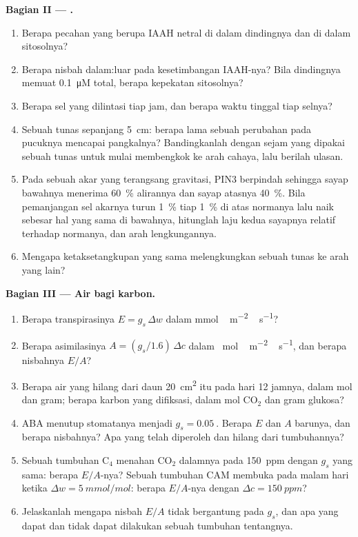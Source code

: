 \begin{problem}
\medskip
\noindent\textbf{Bagian II --- .}
\begin{enumerate}[resume]
  \item Berapa pecahan  yang berupa IAAH netral di dalam dindingnya dan di dalam
        sitosolnya?
  \item Berapa nisbah dalam:luar pada kesetimbangan IAAH-nya? Bila dindingnya memuat
        \qty{0.1}{\micro M}  total, berapa kepekatan
        sitosolnya?
  \item Berapa sel yang dilintasi tiap jam, dan berapa waktu tinggal tiap selnya?
  \item Sebuah tunas sepanjang \qty{5}{cm}: berapa lama sebuah perubahan  pada
        pucuknya mencapai pangkalnya? Bandingkanlah dengan sejam yang dipakai sebuah tunas untuk
        mulai membengkok ke arah cahaya, lalu berilah ulasan.
  \item Pada sebuah akar yang terangsang gravitasi, PIN3 berpindah sehingga
        sayap bawahnya menerima \qty{60}{\%} alirannya dan sayap atasnya
        \qty{40}{\%}. Bila pemanjangan sel akarnya turun \qty{1}{\%} tiap
        \qty{1}{\%}  di atas normanya lalu naik sebesar hal yang sama
        di bawahnya, hitunglah laju kedua sayapnya relatif terhadap normanya,
        dan arah lengkungannya.
  \item Mengapa ketaksetangkupan yang sama melengkungkan sebuah tunas ke arah yang lain?
\end{enumerate}

\medskip
\noindent\textbf{Bagian III --- Air bagi karbon.}
\begin{enumerate}[resume]
  \item Berapa transpirasinya $E = g_{s}\,\Delta w$ dalam \unit{mmol\,m^{-2}\,s^{-1}}?
  \item Berapa asimilasinya $A = (g_{s}/1.6)\,\Delta c$ dalam \unit{\micro
        mol\,m^{-2}\,s^{-1}}, dan berapa nisbahnya $E/A$?
  \item Berapa air yang hilang dari daun \qty{20}{cm^2} itu pada hari 12 jamnya, dalam
        mol dan gram; berapa karbon yang difiksasi, dalam mol CO$_{2}$ dan gram
        glukosa?
  \item ABA menutup stomatanya menjadi $g_{s} = \qty{0.05}{}$. Berapa $E$ dan
        $A$ barunya, dan berapa nisbahnya? Apa yang telah diperoleh dan hilang dari tumbuhannya?
  \item Sebuah tumbuhan C$_{4}$ menahan CO$_{2}$ dalamnya pada \qty{150}{ppm} dengan
        $g_{s}$ yang sama: berapa $E/A$-nya? Sebuah tumbuhan CAM membuka pada malam hari ketika
        $\Delta w = \qty{5}{mmol/mol}$: berapa $E/A$-nya dengan $\Delta c =
        \qty{150}{ppm}$?
  \item Jelaskanlah mengapa nisbah $E/A$ tidak bergantung pada $g_{s}$, dan
        apa yang dapat dan tidak dapat dilakukan sebuah tumbuhan tentangnya.
\end{enumerate}


\end{problem}
